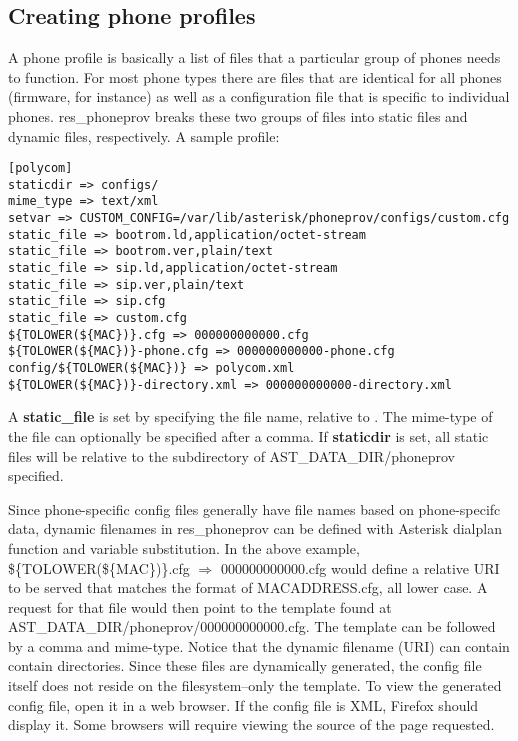 \subsection{Creating phone profiles}

A phone profile is basically a list of files that a particular group of phones needs to 
function.  For most phone types there are files that are identical for all phones 
(firmware, for instance) as well as a configuration file that is specific to individual 
phones.  res\_phoneprov breaks these two groups of files into static files and dynamic 
files, respectively. A sample profile:

\begin{astlisting}
\begin{verbatim}
[polycom]
staticdir => configs/
mime_type => text/xml
setvar => CUSTOM_CONFIG=/var/lib/asterisk/phoneprov/configs/custom.cfg
static_file => bootrom.ld,application/octet-stream
static_file => bootrom.ver,plain/text
static_file => sip.ld,application/octet-stream
static_file => sip.ver,plain/text
static_file => sip.cfg
static_file => custom.cfg
${TOLOWER(${MAC})}.cfg => 000000000000.cfg
${TOLOWER(${MAC})}-phone.cfg => 000000000000-phone.cfg
config/${TOLOWER(${MAC})} => polycom.xml
${TOLOWER(${MAC})}-directory.xml => 000000000000-directory.xml
\end{verbatim}
\end{astlisting}

A \textbf{static\_file} is set by specifying the file name, relative to 
.  The mime-type of the file can optionally be specified 
after a comma.  If \textbf{staticdir} is set, all static files will be relative to the 
subdirectory of AST\_DATA\_DIR/phoneprov specified.

Since phone-specific config files generally have file names based on phone-specifc data, 
dynamic filenames in res\_phoneprov can be defined with Asterisk dialplan function and 
variable substitution. In the above example, \$\{TOLOWER(\$\{MAC\})\}.cfg $\Rightarrow$ 
000000000000.cfg would define a relative URI to be served that matches the format of 
MACADDRESS.cfg, all lower case. A request for that file would then point to the template 
found at AST\_DATA\_DIR/phoneprov/000000000000.cfg. The template can be followed by a 
comma and mime-type. Notice that the dynamic filename (URI) can contain contain 
directories. Since these files are dynamically generated, the config file itself does not 
reside on the filesystem--only the template. To view the generated config file, open it 
in a web browser. If the config file is XML, Firefox should display it. Some browsers 
will require viewing the source of the page requested.

